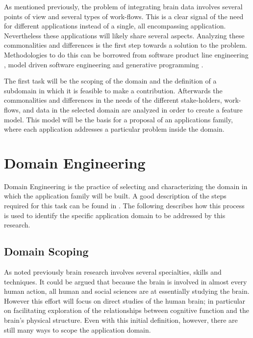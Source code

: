 As mentioned previously, the problem of integrating brain data involves several points of view and several types of work-flows. This is a clear signal of the need for different applications instead of a single, all encompassing application. Nevertheless these applications will likely share several aspects. Analyzing these commonalities and differences is the first step towards a solution to the problem. 
Methodologies to do this can be borrowed from software product line engineering \autocite{pohl_software_2005}, model driven software engineering \autocite{brambilla_model-driven_2012} and generative programming \autocite{czarnecki_generative_2000}. 

The first task will be the scoping of the domain and the definition of a subdomain in which it is feasible to make a contribution. Afterwards the commonalities and differences in the needs of the different stake-holders, work-flows, and data in the selected domain are analyzed in order to create a feature model. This model will be the basis for a proposal of an applications family, where each application addresses a particular problem inside the domain. 


\section{Domain Engineering}

Domain Engineering is the practice of selecting and characterizing the domain in which the application family will be built. A good description of the steps required for this task can be found in \autocite{czarnecki_generative_2000}. The following describes how this process is used to identify the specific application domain to be addressed by this research.

\subsection{Domain Scoping}

As noted previously brain research involves several specialties, skills and techniques. It could be argued that because the brain is involved in almost every human action, all human and social sciences are at essentially studying the brain. However this effort will focus on direct studies of the human brain; in particular on facilitating exploration of the relationships between cognitive function and the brain's physical structure. Even with this initial definition, however, there are still many ways to scope the application domain.

